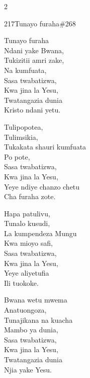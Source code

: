 \documentclass{article}
\begin{document}
\begin{multicols}{2}
\begin{hymn}{217}{Tunayo furaha}{\#268}
\begin{stanza}
Tunayo furaha\\
Ndani yake Bwana,\\
Tukizitii amri zake,\\
Na kumfuata,\\
Sasa twabatizwa,\\
Kwa jina la Yesu,\\
Twatangazia dunia\\
Kristo ndani yetu.
\end{stanza}
\begin{stanza}
Tulipopotea,\\
Tulimsikia,\\
Tukakata shauri kumfuata\\
Po pote,\\
Sasa twabatizwa,\\
Kwa jina la Yesu,\\
Yeye ndiye chanzo chetu\\
Cha furaha zote.
\end{stanza}
\begin{stanza}
Hapa patulivu,\\
Tunalo kusudi,\\
La kumpendeza Mungu\\
Kwa mioyo safi,\\
Sasa twabatizwa,\\
Kwa jina la Yesu,\\
Yeye aliyetufia\\
Ili tuokoke.
\end{stanza}
\begin{stanza}
Bwana wetu mwema\\
Anatuongoza,\\
Tunajikana na kuacha\\
Mambo ya dunia,\\
Sasa twabatizwa,\\
Kwa jina la Yesu,\\
Twatangazia dunia\\
Njia yake Yesu.
\end{stanza}
\end{hymn}


\end{multicols}
\end{document}
